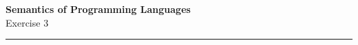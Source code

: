 \documentclass[10pt,a4paper]{exam} %
\begin{document}
\newcommand{\course}{Semantics of Programming Languages}
\newcommand{\week}{3}
\newcommand{\topics}{Data, Subtyping \& Objects, Semantic Equivalence, and Concurrency}

\everymath{\color{campurpledark}}
\everydisplay{\color{campurpledark}}




\marksnotpoints
\pointsdroppedatright
\marksnotpoints
\marginpointname{ \points}

\begin{center}
\LARGE {\textbf{\color{campurpledark} \course} }\\[-0.2cm]
\Large \color{campurpledark} Exercise \week\\
\end{center}

{\color{campurple}\hrule}

\newcommand{\metavar}[1]{{\color{campurple}#1}}

\vspace{0.5cm}
\end{document}
